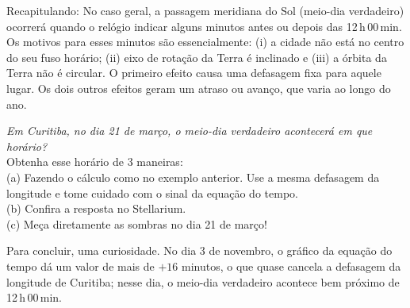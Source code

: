 Recapitulando: No caso geral, a passagem meridiana do Sol (meio-dia verdadeiro) ocorrerá quando o relógio indicar alguns minutos antes ou depois das 12\,h\,00\,min. Os motivos para esses minutos são essencialmente: (i) a cidade não está no centro do seu fuso horário; (ii) eixo de rotação da Terra é inclinado e (iii) a órbita da Terra não é circular. O primeiro efeito causa uma defasagem fixa para aquele lugar. Os dois outros efeitos geram um atraso ou avanço, que varia ao longo do ano. 

\begin{exemplo}{12}
\textit{Em Curitiba, no dia 21 de março, o meio-dia verdadeiro acontecerá em que horário?}\\

Obtenha esse horário de 3 maneiras:\\

(a) Fazendo o cálculo como no exemplo anterior. Use a mesma defasagem da longitude e tome cuidado com o sinal da equação do tempo.\\

(b) Confira a resposta no Stellarium.\\

(c) Meça diretamente as sombras no dia 21 de março! \\
 
\end{exemplo}


Para concluir, uma curiosidade. No dia 3 de novembro, o gráfico da equação do tempo dá um valor de mais de $+16$ minutos, o que quase cancela a defasagem da longitude de Curitiba; nesse dia, o meio-dia verdadeiro acontece bem próximo de 12\,h\,00\,min.
